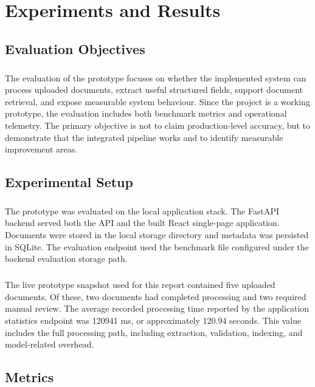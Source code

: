 \chapter{Experiments and Results}
\label{chap:experiments_and_results}

\section{Evaluation Objectives}
\paragraph{} The evaluation of the prototype focuses on whether the implemented system can process uploaded documents, extract useful structured fields, support document retrieval, and expose measurable system behaviour. Since the project is a working prototype, the evaluation includes both benchmark metrics and operational telemetry. The primary objective is not to claim production-level accuracy, but to demonstrate that the integrated pipeline works and to identify measurable improvement areas.

\section{Experimental Setup}
\paragraph{} The prototype was evaluated on the local application stack. The FastAPI backend served both the API and the built React single-page application. Documents were stored in the local storage directory and metadata was persisted in SQLite. The evaluation endpoint used the benchmark file configured under the backend evaluation storage path.

\paragraph{} The live prototype snapshot used for this report contained five uploaded documents. Of these, two documents had completed processing and two required manual review. The average recorded processing time reported by the application statistics endpoint was 120941 ms, or approximately 120.94 seconds. This value includes the full processing path, including extraction, validation, indexing, and model-related overhead.

\section{Metrics}
